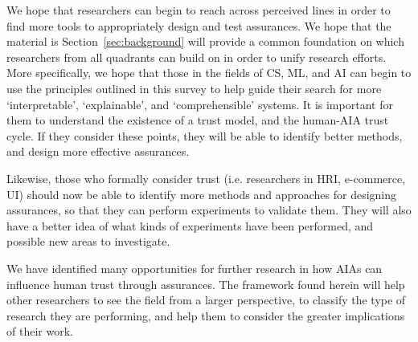     We hope that researchers can begin to reach across perceived lines in order to find more tools to appropriately design and test assurances. We hope that the material is Section~\ref{sec:background} will provide a common foundation on which researchers from all quadrants can build on in order to unify research efforts. More specifically, we hope that those in the fields of CS, ML, and AI can begin to use the principles outlined in this survey to help guide their search for more `interpretable', `explainable', and `comprehensible' systems. It is important for them to understand the existence of a trust model, and the human-AIA trust cycle. If they consider these points, they will be able to identify better methods, and design more effective assurances.
    
    Likewise, those who formally consider trust (i.e. researchers in HRI, e-commerce, UI) should now be able to identify more methods and approaches for designing assurances, so that they can perform experiments to validate them. They will also have a better idea of what kinds of experiments have been performed, and possible new areas to investigate.

    We have identified many opportunities for further research in how AIAs can influence human trust through assurances. The framework found herein will help other researchers to see the field from a larger perspective, to classify the type of research they are performing, and help them to consider the greater implications of their work.

